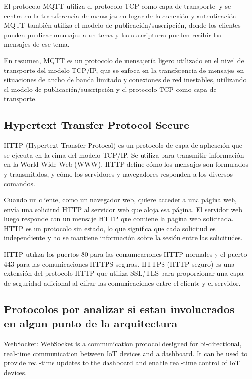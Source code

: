El protocolo MQTT utiliza el protocolo TCP como capa de transporte, y se centra en la transferencia de mensajes en lugar de la conexión y autenticación. MQTT también utiliza el modelo de publicación/suscripción, donde los clientes pueden publicar mensajes a un tema y los suscriptores pueden recibir los mensajes de ese tema.

En resumen, MQTT es un protocolo de mensajería ligero utilizado en el nivel de transporte del modelo TCP/IP, que se enfoca en la transferencia de mensajes en situaciones de ancho de banda limitado y conexiones de red inestables, utilizando el modelo de publicación/suscripción y el protocolo TCP como capa de transporte.


\subsection{Hypertext Transfer Protocol Secure}


HTTP (Hypertext Transfer Protocol) es un protocolo de capa de aplicación que se ejecuta en la cima del modelo TCP/IP. Se utiliza para transmitir información en la World Wide Web (WWW). HTTP define cómo los mensajes son formulados y transmitidos, y cómo los servidores y navegadores responden a los diversos comandos.

Cuando un cliente, como un navegador web, quiere acceder a una página web, envía una solicitud HTTP al servidor web que aloja esa página. El servidor web luego responde con un mensaje HTTP que contiene la página web solicitada. HTTP es un protocolo sin estado, lo que significa que cada solicitud es independiente y no se mantiene información sobre la sesión entre las solicitudes.

HTTP utiliza los puertos 80 para las comunicaciones HTTP normales y el puerto 443 para las comunicaciones HTTPS seguras. HTTPS (HTTP seguro) es una extensión del protocolo HTTP que utiliza SSL/TLS para proporcionar una capa de seguridad adicional al cifrar las comunicaciones entre el cliente y el servidor.




\subsection{Protocolos por analizar si estan involucrados en algun punto de la arquitectura}


WebSocket: WebSocket is a communication protocol designed for bi-directional, real-time communication between IoT devices and a dashboard. It can be used to provide real-time updates to the dashboard and enable real-time control of IoT devices.

